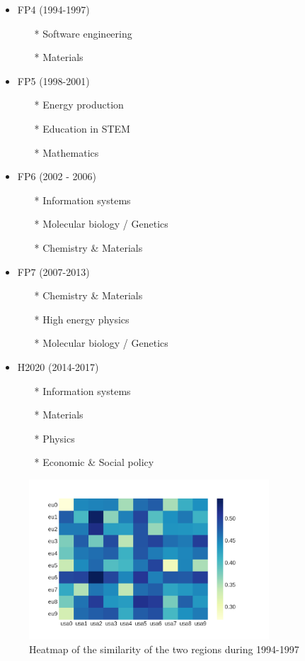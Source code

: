 \documentclass[12pt]{report}
\begin{document}
\begin{itemize}
\item FP4 (1994-1997)
\begin{itemize}
\item[*] Software engineering
\item[*] Materials
\end{itemize}
\item FP5 (1998-2001)
\begin{itemize}
\item[*] Energy production
\item[*] Education in STEM
\item[*] Mathematics
\end{itemize}
\item FP6 (2002 - 2006)
\begin{itemize}
\item[*] Information systems
\item[*] Molecular biology / Genetics
\item[*] Chemistry \& Materials
\end{itemize}
\item FP7 (2007-2013)
\begin{itemize}
\item[*] Chemistry \& Materials
\item[*] High energy physics
\item[*] Molecular biology / Genetics
\end{itemize}
\item H2020 (2014-2017)
\begin{itemize}
\item[*] Information systems
\item[*] Materials
\item[*] Physics
\item[*] Economic \& Social policy
\end{itemize}
\end{itemize}
\begin{figure}[h]
\centering
\includegraphics[width=0.8\textwidth]
{figs/heatmaps/heatmapFP4.png}
\caption{Heatmap of the similarity of the two regions during 1994-1997}
\label{heatmap4}
\end{figure}
\end{document}
